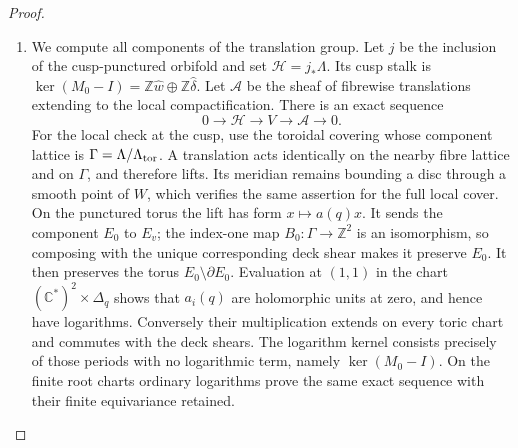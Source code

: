 \begin{proof}
\begin{enumerate}[label=\arabic*.,leftmargin=*]
\item We compute all components of the translation group.  Let $j$ be the
inclusion of the cusp-punctured orbifold and set
$\mathcal H=j_*\Lambda$.  Its cusp stalk is
$\ker(M_0-I)=\mathbb Z\widehat w\oplus\mathbb Z\widehat\delta$.
Let $\mathcal A$ be the sheaf of fibrewise translations extending to
the local compactification.  There is an exact sequence
\begin{equation}\label{eq:P5exponential}
0\longrightarrow\mathcal H\longrightarrow V\longrightarrow\mathcal A
\longrightarrow0.
\end{equation}
For the local check at the cusp, use the toroidal covering whose
component lattice is $\Gamma=\Lambda/\Lambda_{\rm tor}$.  A translation
acts identically on the nearby fibre lattice and on $\Gamma$, and
therefore lifts.  Its meridian remains bounding a disc through a smooth
point of $W$, which verifies the same assertion for the full local
cover.  On the punctured torus the lift has form $x\mapsto a(q)x$.
It sends the component $E_0$ to $E_v$; the index-one map
$B_0:\Gamma\to\mathbb Z^2$ is an isomorphism, so composing with the
unique corresponding deck shear makes it preserve $E_0$.  It then
preserves the torus $E_0\setminus\partial E_0$.  Evaluation at $(1,1)$
in the chart $(\mathbb C^*)^2\times\Delta_q$ shows that $a_i(q)$ are
holomorphic units at zero, and hence have logarithms.  Conversely their
multiplication extends on every toric chart and commutes with the deck
shears.  The logarithm kernel consists precisely of those periods with
no logarithmic term, namely $\ker(M_0-I)$.  On the finite root charts
ordinary logarithms prove the same exact sequence with their finite
equivariance retained.


\end{enumerate}
\end{proof}
